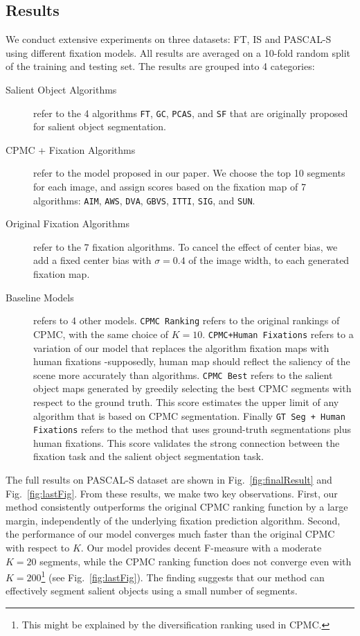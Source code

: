 \subsection{Results}
We conduct extensive experiments on three datasets: FT, IS and PASCAL-S using different fixation models. All results are averaged on a 10-fold random split of the training and testing set. The results are grouped into 4 categories:
\begin{description}
\item [Salient Object Algorithms] refer to the 4 algorithms \verb|FT|\cite{achanta2009frequency}, \verb|GC|\cite{cheng2011global}, \verb|PCAS|\cite{margolin2013makes}, and \verb|SF|\cite{perazzi2012saliency} that are originally proposed for salient object segmentation.
\item [CPMC + Fixation Algorithms] refer to the model proposed in our paper.  We choose the top 10 segments for each image, and assign scores based on the fixation map of 7 algorithms: \verb|AIM|\cite{bruce2005saliency}, \verb|AWS|\cite{garcia2012relationship}, \verb|DVA|\cite{hou2008dynamic}, \verb|GBVS|\cite{harel2006graph}, \verb|ITTI|\cite{itti1998model}, \verb|SIG|\cite{hou2012image}, and \verb|SUN|\cite{zhang2008sun}.
\item [Original Fixation Algorithms] refer to the 7 fixation algorithms.  To cancel the effect of center bias, we add a fixed center bias with $\sigma = 0.4$ of the image width, to each generated fixation map.
\item [Baseline Models] refers to 4 other models.  \verb|CPMC Ranking| refers to the original rankings of CPMC, with the same choice of $K = 10$.  \verb|CPMC+Human Fixations| refers to a variation of our model that replaces the algorithm fixation maps with human fixations -supposedly, human map should reflect the saliency of the scene more accurately than algorithms.  \verb|CPMC Best| refers to the salient object maps generated by greedily selecting the best CPMC segments with respect to the ground truth.  This score estimates the upper limit of any algorithm that is based on CPMC segmentation.  Finally \verb|GT Seg + Human Fixations| refers to the method that uses ground-truth segmentations plus human fixations.  This score validates the strong connection between the fixation task and the salient object segmentation task.
\end{description}

The full results on PASCAL-S dataset are shown in Fig.~\ref{fig:finalResult} and Fig.~\ref{fig:lastFig}. From these results, we make two key observations. First, our method consistently outperforms the original CPMC ranking function by a large margin, independently of the underlying fixation prediction algorithm. Second, the performance of our model converges much faster than the original CPMC with respect to $K$.  Our model provides decent F-measure with a moderate $K = 20$ segments, while the CPMC ranking function does not converge even with $K=200$\footnote{This might be explained by the diversification ranking used in CPMC.} (see Fig.~\ref{fig:lastFig}).  The finding suggests that our method can effectively segment salient objects using a small number of segments.

